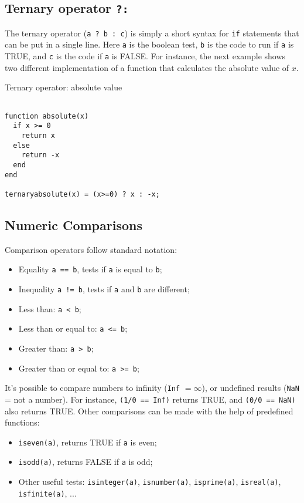 \subsection{Ternary operator \texttt{?:}}

The ternary operator (\texttt{a ? b : c}) is simply a short syntax for \texttt{if} statements that can be put in a single line. Here \texttt{a} is the boolean test, \texttt{b} is the code to run if \texttt{a} is TRUE, and \texttt{c} is the code if \texttt{a} is FALSE. For instance, the next example shows two different implementation of a function that calculates the absolute value of $x$.

\begin{example}{Ternary operator: absolute value}
\label{ex:ternary}
\begin{verbatim}

function absolute(x)
  if x >= 0
    return x
  else
    return -x
  end
end

ternaryabsolute(x) = (x>=0) ? x : -x;
\end{verbatim}
\end{example}

\subsection{Numeric Comparisons}

Comparison operators follow standard notation:

\begin{itemize}
 \item Equality \texttt{a == b}, tests if \texttt{a} is equal to \texttt{b};
 \item Inequality \texttt{a != b}, tests if \texttt{a} and \texttt{b} are different;
 \item Less than: \texttt{a < b};
 \item Less than or equal to: \texttt{a <= b};
 \item Greater than: \texttt{a > b};
 \item Greater than or equal to: \texttt{a >= b};
\end{itemize}

It's possible to compare numbers to infinity (\texttt{Inf} $ = \infty$), or undefined results (\texttt{NaN} = not a number). For instance, \texttt{(1/0 == Inf)} returns TRUE, and \texttt{(0/0 == NaN)} also returns TRUE. Other comparisons can be made with the help of predefined functions:

\begin{itemize}
 \item \texttt{iseven(a)}, returns TRUE if \texttt{a} is even;
 \item \texttt{isodd(a)}, returns FALSE if \texttt{a} is odd;
 \item Other useful tests: \texttt{isinteger(a)}, \texttt{isnumber(a)}, \texttt{isprime(a)}, \texttt{isreal(a)}, \\ \texttt{isfinite(a)}, ...
\end{itemize}

